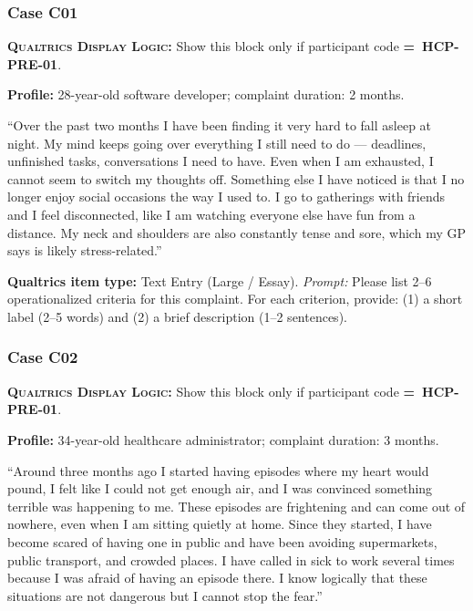 \documentclass[11pt,a4paper]{article}
\newcommand{\responsetextarea}[1]{\begin{tcolorbox}[colback=ResponseBG,colframe=GoldAmber,boxrule=0.6pt,arc=1.5mm,left=6pt,right=6pt,top=5pt,bottom=5pt]\small\textbf{\color{GoldAmber}Qualtrics item type:} Text Entry (Large / Essay). \quad \textit{Prompt:} #1\end{tcolorbox}}
\newcommand{\dlnote}[1]{\par\vspace{0.15em}\noindent\begin{tcolorbox}[colback=AccentAmber,colframe=GoldAmber,boxrule=0.45pt,arc=1mm,left=5pt,right=5pt,top=2.5pt,bottom=2.5pt]\footnotesize\textbf{\color{GoldAmber}\scshape Qualtrics Display Logic:} Show this block only if participant code \textbf{=~#1}.\end{tcolorbox}\vspace{0.1em}}
\begin{document}
\vspace{0.5em}

\subsubsection*{Case C01}
\dlnote{HCP-PRE-01}

\begin{complaintbox}[title=Case C01 --- Complaint Vignette]
\textbf{Profile:} 28-year-old software developer; complaint duration: 2 months.

\smallskip
``Over the past two months I have been finding it very hard to fall asleep at night. My mind keeps going over everything I still need to do --- deadlines, unfinished tasks, conversations I need to have. Even when I am exhausted, I cannot seem to switch my thoughts off. Something else I have noticed is that I no longer enjoy social occasions the way I used to. I go to gatherings with friends and I feel disconnected, like I am watching everyone else have fun from a distance. My neck and shoulders are also constantly tense and sore, which my GP says is likely stress-related.''
\end{complaintbox}

\responsetextarea{Please list 2--6 operationalized criteria for this complaint. For each criterion, provide: (1) a short label (2--5 words) and (2) a brief description (1--2 sentences).}

\vspace{0.4em}
\subsubsection*{Case C02}
\dlnote{HCP-PRE-01}

\begin{complaintbox}[title=Case C02 --- Complaint Vignette]
\textbf{Profile:} 34-year-old healthcare administrator; complaint duration: 3 months.

\smallskip
``Around three months ago I started having episodes where my heart would pound, I felt like I could not get enough air, and I was convinced something terrible was happening to me. These episodes are frightening and can come out of nowhere, even when I am sitting quietly at home. Since they started, I have become scared of having one in public and have been avoiding supermarkets, public transport, and crowded places. I have called in sick to work several times because I was afraid of having an episode there. I know logically that these situations are not dangerous but I cannot stop the fear.''
\end{complaintbox}
\end{document}
